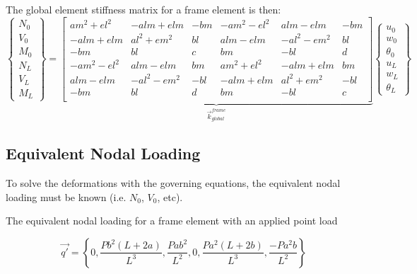 \newpage



\begin{strip}
The global element stiffness matrix for a frame element is then:
	\begin{equation}
		\begin{Bmatrix}
			N_0\\ V_0\\ M_0\\ \hline N_L\\ V_L\\ M_L
		\end{Bmatrix}
	=
	\underbrace{
		\left[
		\begin{array}{c|cc|c|cc}
			am^2 + el^2&-alm + elm&-bm&-am^2 - el^2&alm - elm&-bm\\ \hline
			-alm + elm&al^2 + em^2&bl&alm - elm&-al^2 - em^2&bl\\
			-bm&bl&c&bm&-bl&d\\ \hline
			-am^2 - el^2&alm - elm&bm&am^2 + el^2&-alm + elm&bm\\ \hline
			alm - elm&-al^2 - em^2&-bl&-alm + elm&al^2 + em^2&-bl\\
			-bm&bl&d&bm&-bl&c\\
		\end{array}
		\right]
		}_{\displaystyle{\vec{k}_{global}^{frame}}}
		\begin{Bmatrix}
			u_0\\ w_0\\ \theta_0\\ \hline u_L\\ w_L\\ \theta_L
		\end{Bmatrix}
	\end{equation}
\end{strip}


\subsection{Equivalent Nodal Loading}
To solve the deformations with the governing equations, the equivalent nodal loading must be known (i.e. $N_0$, $V_0$, etc). 

The equivalent nodal loading for a frame element with an applied point load

\begin{equation}
	\vec{q'} = \left\{ 
	0,
	\frac{Pb^2(L+2a)}{L^3},
	\frac{Pab^2}{L^2},
	0,
	\frac{Pa^2(L+2b)}{L^3},
	\frac{-Pa^2b}{L^2}
	\right\}
\end{equation}

